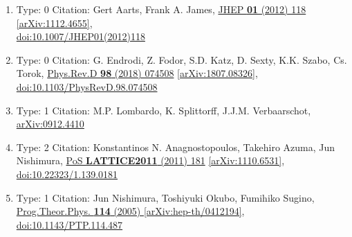 \documentclass[a4paper,10pt]{article}
\begin{document}
\begin{enumerate}
\begin{enumerate}
  \item Type: 0 Citation: Gert Aarts, Frank A. James, \href{https://www.doi.org/10.1007/JHEP01(2012)118}{JHEP {\bf 01} (2012) 118}  \href{https://arxiv.org/abs/1112.4655}{[arXiv:1112.4655]},\\\href{https://www.doi.org/10.1007/JHEP01(2012)118}{doi:10.1007/JHEP01(2012)118}
  \item Type: 0 Citation: G. Endrodi, Z. Fodor, S.D. Katz, D. Sexty, K.K. Szabo, Cs. Torok, \href{https://www.doi.org/10.1103/PhysRevD.98.074508}{Phys.Rev.D {\bf 98} (2018) 074508}  \href{https://arxiv.org/abs/1807.08326}{[arXiv:1807.08326]},\\\href{https://www.doi.org/10.1103/PhysRevD.98.074508}{doi:10.1103/PhysRevD.98.074508}
  \item Type: 1 Citation: M.P. Lombardo, K. Splittorff, J.J.M. Verbaarschot, \href{https://arxiv.org/abs/0912.4410}{arXiv:0912.4410}
  \item Type: 2 Citation: Konstantinos N. Anagnostopoulos, Takehiro Azuma, Jun Nishimura, \href{https://www.doi.org/10.22323/1.139.0181}{PoS {\bf LATTICE2011} (2011) 181}  \href{https://arxiv.org/abs/1110.6531}{[arXiv:1110.6531]},\\\href{https://www.doi.org/10.22323/1.139.0181}{doi:10.22323/1.139.0181}
  \item Type: 1 Citation: Jun Nishimura, Toshiyuki Okubo, Fumihiko Sugino, \href{https://www.doi.org/10.1143/PTP.114.487}{Prog.Theor.Phys. {\bf 114} (2005) }  \href{https://arxiv.org/abs/hep-th/0412194}{[arXiv:hep-th/0412194]},\\\href{https://www.doi.org/10.1143/PTP.114.487}{doi:10.1143/PTP.114.487}

\end{enumerate}
\end{enumerate}
\end{document}

